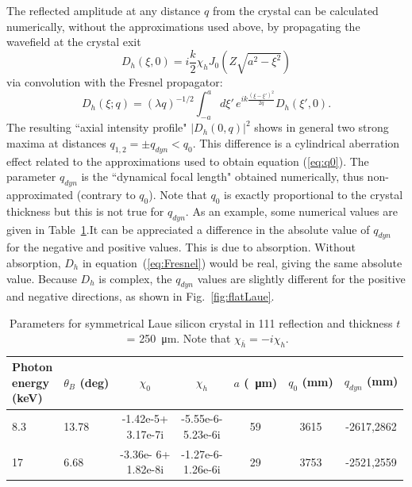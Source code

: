 \documentclass[preprint]{iucr}              %
\begin{document}
The reflected amplitude at any distance $q$ from the crystal can be calculated numerically, without the approximations used above, by propagating the wavefield at the crystal exit
\begin{equation}
    D_h(\xi,0)=i \frac{k}{2}\chi_h J_0(Z\sqrt{a^2-\xi^2})
\end{equation}
via convolution with the Fresnel propagator:
\begin{equation}
\label{eq:Fresnel}
    D_h(\xi; q) = (\lambda q)^{-1/2} \int_{-a}^a d\xi'  \, e^{i k 
    \frac{(\xi-\xi')^2}{2 q}} 
    D_h(\xi',0).
\end{equation}
The resulting ``axial intensity profile" $|D_h(0,q)|^2$ shows in general two strong maxima at distances $q_{1,2}=\pm q_{dyn} < q_0$. This difference is a cylindrical aberration effect related to the approximations used to obtain equation (\ref{eq:q0}). The parameter $q_{dyn}$ is the ``dynamical focal length" obtained numerically, thus non-approximated (contrary to $q_0$). Note that $q_0$ is exactly proportional to the crystal thickness but this is not true for $q_{dyn}$. As an example, some numerical values are given in Table~\ref{table:example}.It can be appreciated a difference in the absolute value of $q_{dyn}$ for the negative and positive values. This is due to absorption. Without absorption, $D_h$ in equation~(\ref{eq:Fresnel}) would be real, giving the same absolute value. Because $D_h$ is complex, the $q_{dyn}$ values are slightly different for the positive and negative directions, as shown in Fig.~\ref{fig:flatLaue}.

\begin{table}
\caption{Parameters for symmetrical Laue silicon crystal in 111 reflection and thickness $t$~= \SI{250}{\micro\meter}. Note that $\chi_{\bar h}=-i\chi_h$.}
\begin{tabular}{llccccc}
 \makecell{Photon \\ energy \\ (keV)}& \makecell{$\theta_B$ \\ (deg)}   & $\chi_0$ & $\chi_h$ & \makecell{$a$ \\ (\SI{}{\micro\meter})}& \makecell{$q_0$ \\ (mm)} & \makecell{$q_{dyn}$ \\ (mm)} \\
\hline
 8.3  &  13.78 & \makecell{-1.42e-5+ \\ 3.17e-7i} & \makecell{-5.55e-6- \\ 5.23e-6i}  & 59  & 3615  & -2617,2862   \\
 17   &  6.68 & \makecell{-3.36e- 6+ \\ 1.82e-8i} & \makecell{-1.27e-6- \\ 1.26e-6i}  & 29  & 3753  & -2521,2559 
\end{tabular}
\label{table:example}
\end{table}
\end{document}
